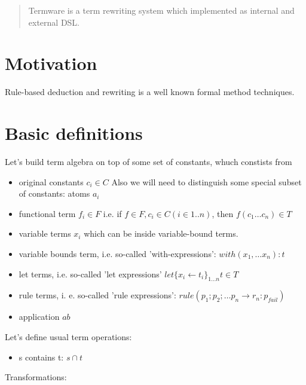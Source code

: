 \documentclass[12pt]{article}
\begin{document}
\maketitle

\begin{abstract}
 Termware is a term rewriting system which implemented as internal and external DSL.
\end{abstract}

\section{Motivation}

  Rule-based deduction and rewriting is a well known formal method techniques.


  
  


\section{Basic definitions}

   Let's build term algebra on top of some set of constants, whuch constists from
\begin{itemize}
 \item original constants ${c_i} \in C$ Also we
 will need to distinguish some special subset of constants: atoms ${a_i}$
 \item functional term $f_i \in F$  i.e. if $f \in F, c_i \in C (i \in 1..n)$, then $f(c_{1} \dots c_{n}) \in T$
 \item variable terms $x_{i}$ which can be inside variable-bound terms.
 \item variable bounds term, i.e. so-called 'with-expressions': $with(x_1,\dots x_n):t$
 \item let terms, i.e. so-called 'let expressions' $let \{ x_i \leftarrow t_i \}_{1\dots n} t  \in T$
 \item rule terms, i. e. so-called 'rule expressions': 
       $rule(p_1 ; p_2 ; \dots p_n \to r_n : p_{fail})$
 \item application $a b$
\end{itemize}

  Let's define usual term operations:
  \begin{itemize}
    \item s contains t: $s \cap t$
  \end{itemize}

  Transformations:
\end{document}

